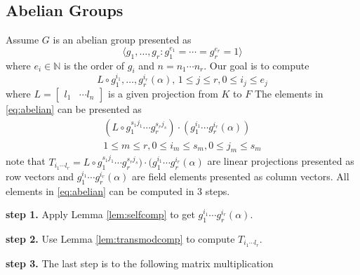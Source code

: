 \subsection{Abelian Groups}
Assume $G$ is an abelian group presented as 
$$ \langle g_1, \ldots , g_r: g_{1}^{e_1} = \cdots = g_{r}^{e_r} = 1 \rangle$$
 where $ e_i \in \mathbb{N}$
is the order of $g_i$ and $n = n_1 \cdots n_r$. Our goal is to compute 
\begin{equation}\label{eq:abelian}
L \circ g_1^{i_1},  \ldots, g_r^{i_r}(\alpha), \, 1 \leq j \leq r, 0 \leq i_j \leq e_j
\end{equation}
 where $L = \begin{bmatrix} l_1 & \cdots l_n \end{bmatrix}$ is a given projection from $K$ to $F$ 
The elements in \eqref{eq:abelian} can be presented as 
\begin{equation}
\begin{split}
(L \circ g_1^{s_1j_1} \cdots g_r^{s_rj_s})\cdot (g_1^{i_1} \cdots g_r^{i_r}(\alpha))\\ 1\leq m \leq r, 0\leq i_m \leq s_m, 0 \leq j_m \leq s_m
\end{split}
\end{equation}
note that $T_{i_1\cdots l_r} = L \circ g_1^{s_1j_1} \cdots g_r^{s_rj_s})\cdot (g_1^{i_1} \cdots g_r^{i_r}(\alpha)$ are linear projections 
presented as row vectors and $g_1^{i_1} \cdots g_r^{i_r}(\alpha)$ are field elements presented as column vectors. All elements in \eqref{eq:abelian} can be computed in 3 steps.

\textbf{step 1.} Apply Lemma \ref{lem:selfcomp} to get $g_1^{i_1} \cdots g_r^{i_r}(\alpha)$.

\textbf{step 2.} Use Lemma \ref{lem:transmodcomp} to compute $T_{i_1\cdots l_r}$.

\textbf{step 3.} The last step is to the following matrix multiplication

